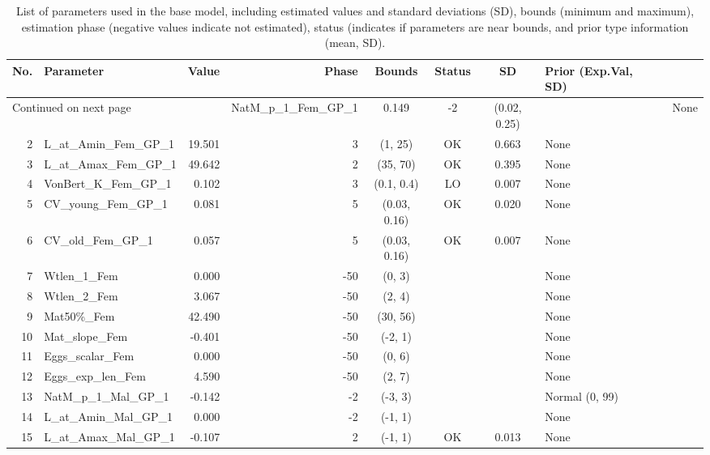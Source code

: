 \documentclass[12pt,]{article}
\begin{document}
\begin{landscape}
\begin{longtable}{rlrrcccl}
\caption{List of parameters used in
                                              the base model, including estimated 
                                              values and standard deviations (SD), 
                                              bounds (minimum and maximum), 
                                              estimation phase (negative values indicate
                                              not estimated), status (indicates if 
                                              parameters are near bounds, and prior type
                                              information (mean, SD).} \\ 
  \hline
No. & Parameter & Value & Phase & Bounds & Status & SD & Prior (Exp.Val, SD)  \\ 
  \hline 
\endhead 
\hline 
\multicolumn{3}{l}{\footnotesize Continued on next page} 
\endfoot 
\endlastfoot 
 \hline
1 & NatM\_p\_1\_Fem\_GP\_1 & 0.149 & -2 & (0.02, 0.25) &  &  & None \\ 
  2 & L\_at\_Amin\_Fem\_GP\_1 & 19.501 & 3 & (1, 25) & OK & 0.663 & None \\ 
  3 & L\_at\_Amax\_Fem\_GP\_1 & 49.642 & 2 & (35, 70) & OK & 0.395 & None \\ 
  4 & VonBert\_K\_Fem\_GP\_1 & 0.102 & 3 & (0.1, 0.4) & LO & 0.007 & None \\ 
  5 & CV\_young\_Fem\_GP\_1 & 0.081 & 5 & (0.03, 0.16) & OK & 0.020 & None \\ 
  6 & CV\_old\_Fem\_GP\_1 & 0.057 & 5 & (0.03, 0.16) & OK & 0.007 & None \\ 
  7 & Wtlen\_1\_Fem & 0.000 & -50 & (0, 3) &  &  & None \\ 
  8 & Wtlen\_2\_Fem & 3.067 & -50 & (2, 4) &  &  & None \\ 
  9 & Mat50\%\_Fem & 42.490 & -50 & (30, 56) &  &  & None \\ 
  10 & Mat\_slope\_Fem & -0.401 & -50 & (-2, 1) &  &  & None \\ 
  11 & Eggs\_scalar\_Fem & 0.000 & -50 & (0, 6) &  &  & None \\ 
  12 & Eggs\_exp\_len\_Fem & 4.590 & -50 & (2, 7) &  &  & None \\ 
  13 & NatM\_p\_1\_Mal\_GP\_1 & -0.142 & -2 & (-3, 3) &  &  & Normal (0, 99) \\ 
  14 & L\_at\_Amin\_Mal\_GP\_1 & 0.000 & -2 & (-1, 1) &  &  & None \\ 
  15 & L\_at\_Amax\_Mal\_GP\_1 & -0.107 & 2 & (-1, 1) & OK & 0.013 & None \\ 

\end{longtable}
\end{landscape}
\end{document}
